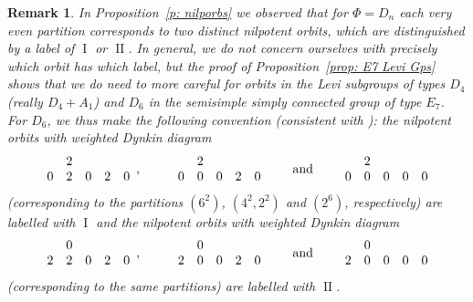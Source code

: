 \documentclass[11pt]{amsart}
\newcommand{\I}{{\mathfrak I}}
\newcommand{\II}{{\operatorname{II}}}
\renewcommand{\I}{{\operatorname{I}}}
\newtheorem{rmk}{Remark}
\numberwithin{equation}{section}
\begin{document}
	\begin{rmk}\label{rmk: labs}
		In Proposition~\ref{p: nilporbs} we observed that for $\Phi=D_n$ each very even partition corresponds to two distinct nilpotent orbits, which are distinguished by a label of $\I$ or $\II$. In general, we do not concern ourselves with precisely which orbit has which label, but the proof of Proposition~\ref{prop: E7 Levi Gps} shows that we do need to more careful for orbits in the Levi subgroups of types $D_4$ (really $D_4+A_1$) and $D_6$ in the semisimple simply connected group of type $E_7$. For $D_6$, we thus make the following convention (consistent with \cite[Lemma 5.3.5]{CM}): the nilpotent orbits with weighted Dynkin diagram $$\renewcommand{\arraystretch}{}\begin{array}{c c c c c}
			& 2 & & &  \\
			0 & 2 & 0 & 2 & 0   \\
		\end{array},\quad\ \quad \begin{array}{c c c c c}
			& 2 &  & &\\
			0 & 0 & 0 & 2 & 0\\
		\end{array}\quad  \quad\mbox{and}\quad \quad \begin{array}{c c c c c}
			& 2 & &  &\\
			0 & 0 & 0 & 0 & 0 \\
		\end{array}$$ (corresponding to the partitions $(6^2)$, $(4^2,2^2)$ and $(2^6)$, respectively) are labelled with $\I$ and the nilpotent orbits with weighted Dynkin diagram 
		$$\renewcommand{\arraystretch}{}\begin{array}{c c c c c}
			& 0 & & &  \\
			2 & 2 & 0 & 2 & 0   \\
		\end{array},\quad\ \quad \begin{array}{c c c c c}
			& 0 &  & &\\
			2 & 0 & 0 & 2 & 0\\
		\end{array}\quad  \quad\mbox{and}\quad \quad \begin{array}{c c c c c}
			& 0 & &  &\\
			2 & 0 & 0 & 0 & 0 \\
		\end{array}$$
		(corresponding to the same partitions) are labelled with $\II$.
		

\end{rmk}
\end{document}
